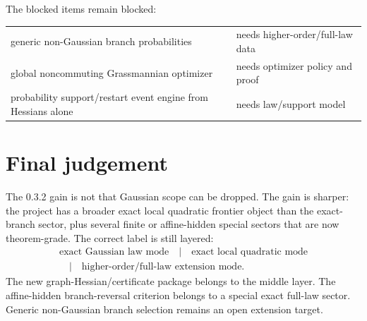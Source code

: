 \documentclass[11pt,a4paper]{article}
\numberwithin{equation}{section}
\theoremstyle{thmcompact}
\theoremstyle{remark}
\begin{document}
The blocked items remain blocked:
\begin{center}
\small
\begin{tabular}{p{}p{}}
generic non-Gaussian branch probabilities & needs higher-order/full-law data\\
global noncommuting Grassmannian optimizer & needs optimizer policy and proof\\
probability support/restart event engine from Hessians alone & needs law/support model
\end{tabular}
\end{center}

\section{Final judgement}

The 0.3.2 gain is not that Gaussian scope can be dropped. The gain is sharper: the project has a broader exact local quadratic frontier object than the exact-branch sector, plus several finite or affine-hidden special sectors that are now theorem-grade. The correct label is still layered:
\[
\begin{gathered}
\text{exact Gaussian law mode}
\quad|\quad
\text{exact local quadratic mode}\\
\quad|\quad
\text{higher-order/full-law extension mode}.
\end{gathered}
\]
The new graph-Hessian/certificate package belongs to the middle layer. The affine-hidden branch-reversal criterion belongs to a special exact full-law sector. Generic non-Gaussian branch selection remains an open extension target.
\end{document}
